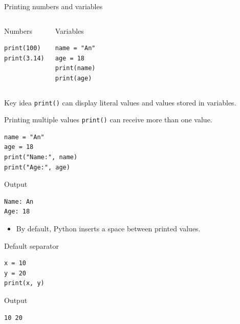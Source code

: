 \documentclass[aspectratio=169,10pt]{beamer}
\begin{document}
\begin{frame}[fragile]{Printing numbers and variables}
\begin{columns}[T,onlytextwidth]
\begin{block}{Numbers}
\begin{lstlisting}
print(100)
print(3.14)
\end{lstlisting}
\end{block}
\begin{block}{Variables}
\begin{lstlisting}
name = "An"
age = 18
print(name)
print(age)
\end{lstlisting}
\end{block}
\end{columns}
\vspace{0.3cm}
\begin{alertblock}{Key idea}
\texttt{print()} can display literal values and values stored in variables.
\end{alertblock}
\end{frame}

\begin{frame}[fragile]{Printing multiple values}
\texttt{print()} can receive more than one value.
\begin{lstlisting}
name = "An"
age = 18
print("Name:", name)
print("Age:", age)
\end{lstlisting}
\begin{block}{Output}
\begin{verbatim}
Name: An
Age: 18
\end{verbatim}
\end{block}
\begin{itemize}
  \item By default, Python inserts a space between printed values.
\end{itemize}
\end{frame}

\begin{frame}[fragile]{Default separator}
\begin{lstlisting}
x = 10
y = 20
print(x, y)
\end{lstlisting}
\begin{block}{Output}
\begin{verbatim}
10 20
\end{verbatim}
\end{block}
\begin{center}
\end{center}
\end{frame}
\end{document}
